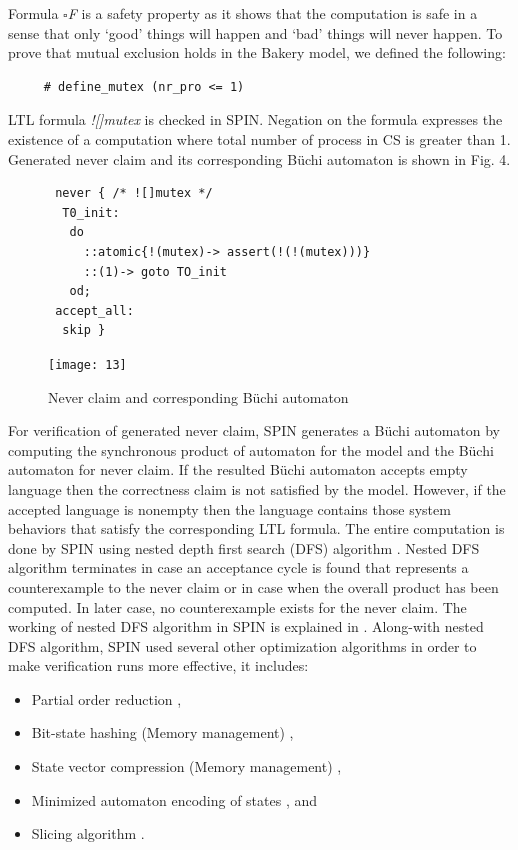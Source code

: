 \documentclass[conference]{IEEEtran}
\begin{document}
Formula $\square$\emph{F} is a safety property as it shows that the computation is safe in a sense that only `good' things will happen and `bad' 
things will never happen. To prove that mutual exclusion holds in the Bakery model, we defined the following:  

\begin{verbatim}
     # define_mutex (nr_pro <= 1)
\end{verbatim}

LTL formula \emph{![]mutex} is checked in SPIN. Negation on the formula expresses the existence of a computation where total number of process in 
CS is greater than 1. Generated never claim and its corresponding B\"uchi automaton is shown in Fig. 4.

\begin{figure}[!ht]
{\small \begin{verbatim}
 never { /* ![]mutex */
  T0_init:
   do
     ::atomic{!(mutex)-> assert(!(!(mutex)))}
     ::(1)-> goto TO_init
   od;
 accept_all:
  skip }
\end{verbatim}}\vspace{-5mm}
\centering\texttt{[image: 13]}
\caption{Never claim and corresponding B\"uchi automaton} 
\end{figure}

For verification of generated never claim, SPIN generates a B\"uchi automaton by computing the synchronous product of automaton for the model 
and the B\"uchi automaton for never claim. If the resulted B\"uchi automaton accepts empty language then the correctness claim is not 
satisfied by the model. However, if the accepted language is nonempty then the language contains those system behaviors that satisfy the 
corresponding LTL formula. The entire computation is done by SPIN using nested depth first search (DFS) algorithm \cite{25}. Nested DFS algorithm 
terminates in case an acceptance cycle is found that represents a counterexample to the never claim or in case when the overall product has been
computed. In later case, no counterexample exists for the never claim. The working of nested DFS algorithm in SPIN is explained in \cite{26}. 
Along-with nested DFS algorithm, SPIN used several other optimization algorithms in order to make verification runs more effective, it includes:
\begin{itemize}
 \item Partial order reduction \cite{27},
 \item Bit-state hashing (Memory management) \cite{28},
 \item State vector compression (Memory management) \cite{29},
 \item Minimized automaton encoding of states \cite{30}, and
 \item Slicing algorithm \cite{31}.
\end{itemize}
\end{document}
